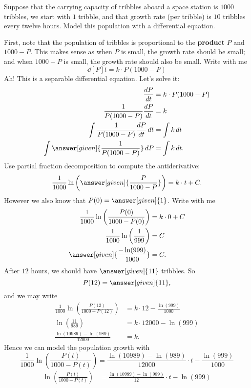 \documentclass{ximera}
\begin{document}
\begin{example}
Suppose that the carrying capacity of tribbles aboard a space station
is $1000$ tribbles, we start with $1$ tribble, and that growth rate
(per tribble) is $10$ tribbles every twelve hours. Model this
population with a differential equation.
\begin{explanation}
  First, note that the population of tribbles is proportional to the
  \textbf{product} $P$ and $1000-P$. This makes sense as when $P$ is
  small, the growth rate should be small; and when $1000-P$ is small,
  the growth rate should also be small. Write with me
  \[
  \dd[P]{t}  = k \cdot P (1000-P)
  \]
  Ah! This is a separable differential equation. Let's solve it:
  \begin{align*}
    \dd[P]{t}  &= k \cdot P (1000-P)\\
    \frac{1}{P (1000-P)}\dd[P]{t}  &= k \\
    \int \frac{1}{P (1000-P)}\dd[P]{t}\d t  &= \int k\d t \\
    \int \answer[given]{\frac{1}{P (1000-P)}} \d P  &= \int k\d t.
  \end{align*}
  Use partial fraction decomposition to compute the antiderivative:
  \[
    \frac{1}{1000}\ln\left(\answer[given]{\frac{P}{1000-P}}\right)   = k\cdot t + C.
  \]
  However we also know that $P(0) = \answer[given]{1}$. Write with me
  \begin{align*}
      \frac{1}{1000}\ln\left(\frac{P(0)}{1000-P(0)}\right)  &= k\cdot 0 + C\\
      \frac{1}{1000}\ln\left(\frac{1}{999}\right)  &= C\\
      \answer[given]{\frac{-\ln(999)}{1000}}  &= C.
  \end{align*}
  After $12$ hours, we should have $\answer[given]{11}$ tribbles. So 
  \[
  P(12) = \answer[given]{11},
  \]
  and we may write
  \begin{align*}
    \frac{1}{1000}\ln\left(\frac{P(12)}{1000-P(12)}\right) &= k\cdot 12-\frac{\ln(999)}{1000}\\
    \ln\left(\frac{11}{989}\right) &= k\cdot 12000-\ln(999) \\
    \frac{\ln(10989)-\ln(989)}{12000} &= k.
  \end{align*}
  Hence we can model the population growth with
  \[
  \frac{1}{1000}\ln\left(\frac{P(t)}{1000-P(t)}\right) = \frac{\ln(10989)-\ln(989)}{12000}\cdot t - \frac{\ln(999)}{1000}
  \]
  \begin{align*}
    \ln\left(\frac{P(t)}{1000-P(t)}\right)  &= \frac{\ln(10989)-\ln(989)}{12}\cdot t - \ln(999)\\

\end{align*}
\end{explanation}
\end{example}
\end{document}
